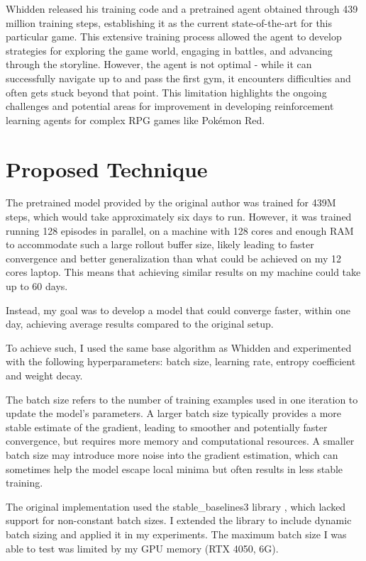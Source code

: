 \documentclass[10pt,conference]{IEEEtran}
\begin{document}
Whidden released his training code and a pretrained agent obtained through 439 million training steps, establishing it as the current state-of-the-art for this particular game. This extensive training process allowed the agent to develop strategies for exploring the game world, engaging in battles, and advancing through the storyline. However, the agent is not optimal - while it can successfully navigate up to and pass the first gym, it encounters difficulties and often gets stuck beyond that point. This limitation highlights the ongoing challenges and potential areas for improvement in developing reinforcement learning agents for complex RPG games like Pokémon Red.



\newpage



\section{Proposed Technique}

The pretrained model provided by the original author was trained for 439M steps, which would take approximately six days to run. However, it was trained running 128 episodes in parallel, on a machine with 128 cores and enough RAM to accommodate such a large rollout buffer size, likely leading to faster convergence and better generalization than what could be achieved on my 12 cores laptop. This means that achieving similar results on my machine could take up to 60 days.

Instead, my goal was to develop a model that could converge faster, within one day, achieving average results compared to the original setup. 

To achieve such, I used the same base algorithm as Whidden and experimented with the following hyperparameters: batch size, learning rate, entropy coefficient and weight decay.

The batch size refers to the number of training examples used in one iteration to update the model's parameters. A larger batch size typically provides a more stable estimate of the gradient, leading to smoother and potentially faster convergence, but requires more memory and computational resources. A smaller batch size may introduce more noise into the gradient estimation, which can sometimes help the model escape local minima but often results in less stable training.

The original implementation used the stable\_baselines3 library \cite{ref:stable-baselines3}, which lacked support for non-constant batch sizes. I extended the library to include dynamic batch sizing and applied it in my experiments. The maximum batch size I was able to test was limited by my GPU memory (RTX 4050, 6G).
\end{document}
